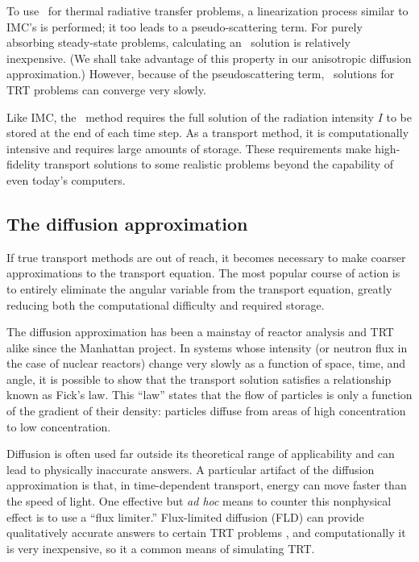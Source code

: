 To use \SN\ for thermal radiative transfer problems, a linearization process
similar to IMC's is performed; it too leads to a pseudo-scattering term.
For purely absorbing steady-state problems, calculating an \SN\ solution is
relatively inexpensive. (We shall take advantage of this property in our
anisotropic diffusion approximation.) However, because of the pseudoscattering
term, \SN\ solutions for TRT problems can converge very slowly.

Like IMC, the \SN\ method requires the full solution of the radiation intensity
$I$ to be stored at the end of each time step. As a transport method, it is
computationally intensive and requires large amounts of storage. These
requirements make high-fidelity transport solutions to some realistic problems
beyond the capability of even today's computers.

\subsection{The diffusion approximation}
If true transport methods are out of reach, it becomes necessary to make
coarser approximations to the transport equation.
The most popular course of action is to entirely eliminate the angular variable
from the transport equation, greatly reducing both the computational difficulty
and required storage.

The diffusion approximation has been a mainstay of reactor analysis and TRT
alike since the Manhattan project. In systems whose intensity (or neutron flux
in the case of nuclear reactors) change very slowly as a function of space, time, and
angle, it is possible to show \cite{Lar1975,Lar1983a} that the transport
solution satisfies a relationship known as Fick's law. This ``law'' states that
the flow of particles is only a function of the gradient of their density:
particles diffuse from areas of high concentration to low concentration.

Diffusion is often used far outside its theoretical range of applicability and
can lead to physically inaccurate answers. A particular artifact of the
diffusion approximation is that, in time-dependent transport, energy can
move faster than the speed of light. One effective but \emph{ad hoc} means to
counter this nonphysical effect is to use a ``flux limiter.''
Flux-limited diffusion (FLD) can provide qualitatively accurate answers to
certain TRT problems \cite{Ols2000}, and computationally it is very
inexpensive, so it a common means of simulating TRT.

